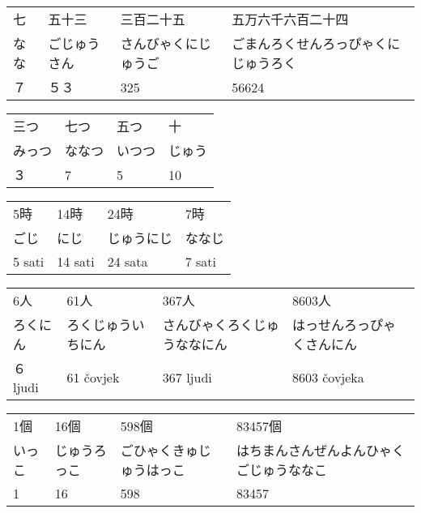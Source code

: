 
\author{Katja Kržišnik}

	
	
	
	\begin{tabular}{l l l l}
		七	&	五十三	&	三百二十五	&	五万六千六百二十四	\\
		なな	&	ごじゅうさん	&	さんびゃくにじゅうご			&	ごまんろくせんろっぴゃくにじゅうろく	\\
		７	&	５３&	325&	56624	\\
	\end{tabular}


    \begin{tabular}{l l l l}
	       三つ	&	七つ	&	五つ			&	十	\\
	      みっつ	&	ななつ	&	いつつ			&	じゅう	\\
	       ３	&	7   &	5   &	10	\\
    \end{tabular}


\begin{tabular}{l l l l}
	5時	&	14時	&	24時			&	7時	\\
	ごじ	&	にじ	&	じゅうにじ	&	ななじ	\\
	5 sati	&	14 sati   &	24 sata  &	7 sati	\\
\end{tabular}


\begin{tabular}{l l l l}
	6人	&	61人	&	367人		&	8603人	\\
	ろくにん	&	ろくじゅういちにん	&	さんびゃくろくじゅうななにん	&	はっせんろっぴゃくさんにん	\\
	６ ljudi	&	61 čovjek   &	367 ljudi  &	8603 čovjeka	\\
\end{tabular}


\begin{tabular}{l l l l}
	1個	&	16個	&	598個		&	83457個	\\
	いっこ	&	じゅうろっこ	&	ごひゃくきゅじゅうはっこ	&	はちまんさんぜんよんひゃくごじゅうななこ	\\
	1	&	16   &	598  &	83457	\\
\end{tabular}

